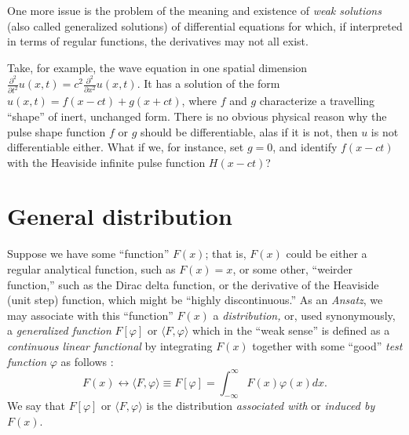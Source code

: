 One more issue is the problem of the meaning and existence of
{\em weak solutions} (also called   generalized solutions)
of differential equations  for which, if interpreted in terms of regular functions,
the derivatives may not all exist.

{
\color{blue}
\bexample
Take, for example, the wave equation in one spatial dimension
$
\frac{\partial^2 }{\partial t^2} u(x,t)
=c^2
\frac{\partial^2 }{\partial x^2} u(x,t)
.
$
It has a  solution of the form \cite{Barut1990349} $ u(x,t)= f(x-ct) + g(x+ct)$,
where $f$ and $g$ characterize  a travelling ``shape'' of inert, unchanged form.
There is no obvious physical reason why the pulse shape function $f$ or $g$ should be differentiable,
alas if it is not, then $u$ is not differentiable either.
What if we, for instance, set $g=0$, and identify $f(x-ct)$ with the Heaviside infinite pulse function $H(x-ct)$?

\eexample
}


\section{General distribution}

Suppose we have some ``function'' $F(x)$; that is, $F(x)$ could be either
a regular analytical function, such as $F(x)=x$,
or some other, ``weirder function,'' such as the Dirac delta function,
or the derivative of the Heaviside (unit step) function, which might be ``highly discontinuous.''
As an {\it Ansatz},  we may associate with this ``function'' $F(x)$
a
{\em distribution,}
or, used synonymously,
a
{\em generalized function}
$F[\varphi ]$
or $\langle F , \varphi \rangle $
which
in the ``weak sense'' is  defined as a {\em continuous linear functional}
by integrating $F(x)$ together with some ``good'' {\em test function} $\varphi$
as follows \cite{schwartz}:
\begin{equation}
 F(x) \longleftrightarrow \langle F , \varphi \rangle \equiv F[\varphi] =\int_{-\infty}^{\infty} F(x) \varphi (x) dx.
\end{equation}
We say that $F[\varphi ]$ or $\langle F , \varphi \rangle $ is the distribution {\em associated with}
or {\em induced by}
$F(x)$.


